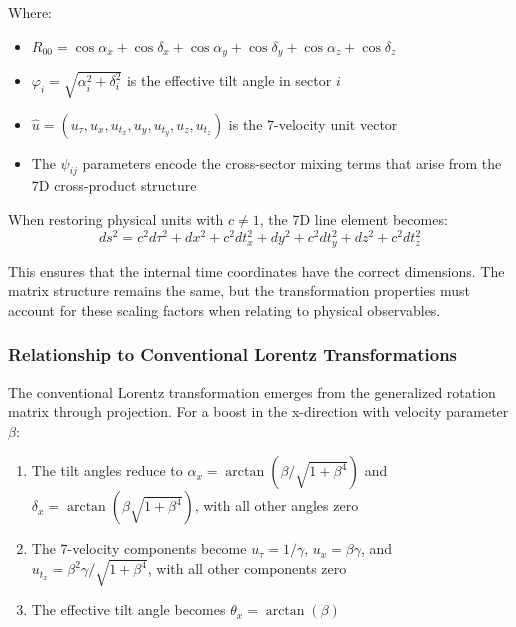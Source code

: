 \documentclass{article}
\begin{document}
\begin{landscape}
Where:
\begin{itemize}
\item $R_{00} = \cos\alpha_x+\cos\delta_x+\cos\alpha_y+\cos\delta_y+\cos\alpha_z+\cos\delta_z$
\item $\varphi_i = \sqrt{\alpha_i^2 + \delta_i^2}$ is the effective tilt angle in sector $i$
\item $\hat{u} = (u_\tau, u_x, u_{t_x}, u_y, u_{t_y}, u_z, u_{t_z})$ is the 7-velocity unit vector
\item The $\psi_{ij}$ parameters encode the cross-sector mixing terms that arise from the 7D cross-product structure
\end{itemize}

\end{landscape}


\restoregeometry %
\endgroup

When restoring physical units with $c \neq 1$, the 7D line element becomes:
\begin{equation}
ds^2 = c^2 d\tau^2 + dx^2 + c^2 dt_x^2 + dy^2 + c^2 dt_y^2 + dz^2 + c^2 dt_z^2
\end{equation}

This ensures that the internal time coordinates have the correct dimensions. The matrix structure remains the same, but the transformation properties must account for these scaling factors when relating to physical observables.

\subsubsection{Relationship to Conventional Lorentz Transformations}

The conventional Lorentz transformation emerges from the generalized rotation matrix through projection. For a boost in the x-direction with velocity parameter $\beta$:

\begin{enumerate}
\item The tilt angles reduce to $\alpha_x = \arctan(\beta/\sqrt{1+\beta^4})$ and $\delta_x = \arctan(\beta\sqrt{1+\beta^4})$, with all other angles zero

\item The 7-velocity components become $u_\tau = 1/\gamma$, $u_x = \beta\gamma$, and $u_{t_x} = \beta^2\gamma/\sqrt{1+\beta^4}$, with all other components zero

\item The effective tilt angle becomes $\theta_x = \arctan(\beta)$
\end{enumerate}
\end{document}
